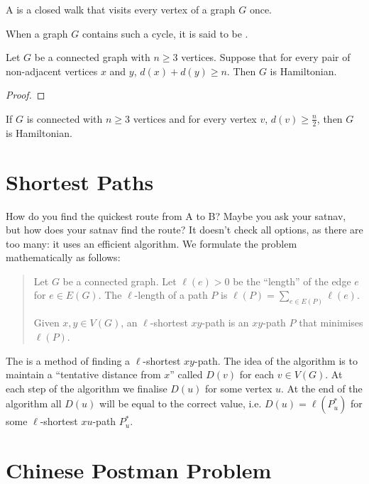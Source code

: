\begin{definition}
A  is a closed walk that visits every vertex of a graph $G$ once.

When a graph $G$ contains such a cycle, it is said to be .
\end{definition}

\begin{theorem}
Let $G$ be a connected graph with $n\ge3$ vertices. Suppose that for every pair of non-adjacent vertices $x$ and $y$, $d(x)+d(y)\ge n$. Then $G$ is Hamiltonian.
\end{theorem}

\begin{proof}

\end{proof}

\begin{corollary}
If $G$ is connected with $n\ge3$ vertices and for every vertex $v$, $d(v)\ge\frac{n}{2}$, then $G$ is Hamiltonian.
\end{corollary}

\section{Shortest Paths}
How do you find the quickest route from A to B? Maybe you ask your satnav, but how does your satnav find the route? It doesn't check all options, as there are too many: it uses an efficient algorithm. We formulate the problem mathematically as follows:

\begin{quote}
Let $G$ be a connected graph. Let $\ell(e)>0$ be the ``length'' of the edge $e$ for $e\in E(G)$. The $\ell$-length of a path $P$ is $\ell(P)=\sum_{e\in E(P)}\ell(e)$.

Given $x,y\in V(G)$, an $\ell$-shortest $xy$-path is an $xy$-path $P$ that minimises $\ell(P)$.
\end{quote}

The  is a method of finding a $\ell$-shortest $xy$-path. The idea of the algorithm is to maintain a ``tentative distance from $x$'' called $D(v)$ for each $v\in V(G)$. At each step of the algorithm we finalise $D(u)$ for some vertex $u$. At the end of the algorithm all $D(u)$ will be equal to the correct value, i.e. $D(u)=\ell(P_u^*)$ for some $\ell$-shortest $xu$-path $P_u^*$.

\section{Chinese Postman Problem}


